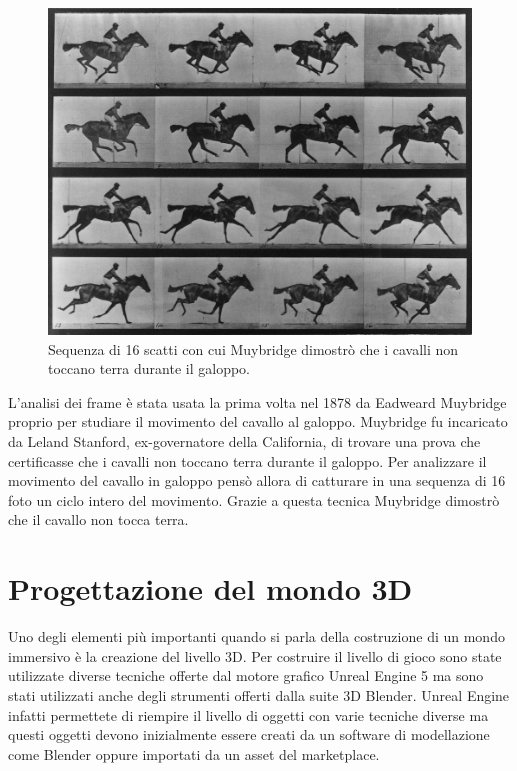     
    \begin{figure}[b]
        \centering
        \includegraphics[width=.8\textwidth]{figure/Muybridge.jpg}
        \caption{Sequenza di 16 scatti con cui Muybridge dimostrò che i cavalli non toccano terra durante il galoppo.}
    \end{figure}

    L'analisi dei frame è stata usata la prima volta nel 1878 da Eadweard Muybridge proprio per studiare il movimento del cavallo al galoppo.
    Muybridge fu incaricato da Leland Stanford, ex-governatore della California, di trovare una prova che certificasse che i cavalli non toccano terra durante il galoppo.
    Per analizzare il movimento del cavallo in galoppo pensò allora di catturare in una sequenza di 16 foto un ciclo intero del movimento.
    Grazie a questa tecnica Muybridge dimostrò che il cavallo non tocca terra.

    
    \section{Progettazione del mondo 3D}

    Uno degli elementi più importanti quando si parla della costruzione di un mondo immersivo è la creazione del livello 3D.
    Per costruire il livello di gioco sono state utilizzate diverse tecniche offerte dal motore grafico Unreal Engine 5 ma sono stati utilizzati anche degli strumenti offerti dalla suite 3D Blender.
    Unreal Engine infatti permettete di riempire il livello di oggetti con varie tecniche diverse ma questi oggetti devono inizialmente essere creati da un software di modellazione come Blender oppure importati da un asset del marketplace.

